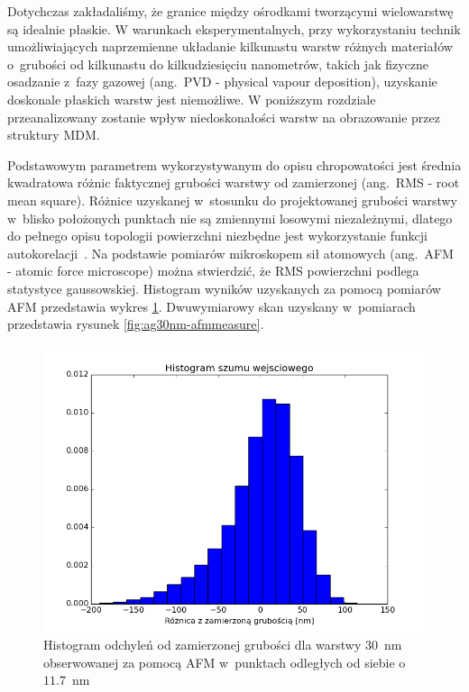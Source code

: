 Dotychczas zakładaliśmy, że granice między ośrodkami tworzącymi wielowarstwę są idealnie płaskie. W warunkach eksperymentalnych, przy wykorzystaniu technik umożliwiających naprzemienne układanie kilkunastu warstw różnych materiałów o~grubości od kilkunastu do kilkudziesięciu nanometrów,  takich jak fizyczne osadzanie z~fazy gazowej (ang.~PVD - physical vapour deposition), uzyskanie doskonale płaskich warstw jest niemożliwe. W poniższym rozdziale przeanalizowany zostanie wpływ niedoskonałości warstw na obrazowanie przez struktury MDM.

Podstawowym parametrem wykorzystywanym do opisu chropowatości jest średnia kwadratowa różnic faktycznej grubości warstwy od zamierzonej (ang.~RMS - root mean square). Różnice uzyskanej w~stosunku do projektowanej grubości warstwy w~blisko położonych punktach nie są zmiennymi losowymi niezależnymi, dlatego do pełnego opisu topologii powierzchni niezbędne jest wykorzystanie funkcji autokorelacji~\cite{stefaniuk2011effect}. Na podstawie pomiarów mikroskopem sił atomowych (ang.~AFM - atomic force microscope) można stwierdzić, że RMS powierzchni podlega statystyce gaussowskiej. Histogram wyników uzyskanych za pomocą pomiarów AFM przedstawia wykres \ref{fig:ag30nm-afmhist}. Dwuwymiarowy skan uzyskany w~pomiarach przedstawia rysunek \ref{fig:ag30nm-afmmeasure}.

\begin{figure}[bt]
		\includegraphics[width=\textwidth]{images/multilayer/ag30nm-afm-measure-hist.png}
		\caption{Histogram odchyleń od zamierzonej grubości dla warstwy $30$~nm obserwowanej za pomocą AFM w~punktach odległych od siebie o~$11.7$~nm} 		\label{fig:ag30nm-afmhist}
\end{figure}

